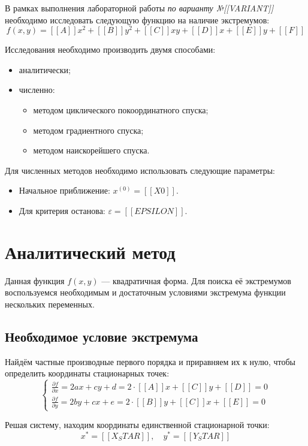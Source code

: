 \documentclass[12pt]{article}
\begin{document}
В рамках выполнения лабораторной работы \textit{по варианту №[[VARIANT]]} необходимо исследовать следующую функцию на наличие экстремумов:
\[
  f(x, y) = [[A]]x^2 + [[B]]y^2 + [[C]]xy + [[D]]x + [[E]]y + [[F]]
\]

Исследования необходимо производить двумя способами:
\begin{itemize}
  \item аналитически;
  \item численно:
  \begin{itemize}
    \item методом циклического покоординатного спуска;
    \item методом градиентного спуска;
    \item методом наискорейшего спуска.
  \end{itemize}
\end{itemize}

Для численных методов необходимо использовать следующие параметры:
\begin{itemize}
  \item Начальное приближение: \( x^{(0)}=[[X0]] \).
  \item Для критерия останова: \( \varepsilon = [[EPSILON]] \).
\end{itemize}

\newpage

\section{Аналитический метод}

Данная функция \( f(x,y) \) --- квадратичная форма. Для поиска её экстремумов воспользуемся необходимым и достаточным условиями экстремума функции нескольких переменных.

\subsection{Необходимое условие экстремума}

Найдём частные производные первого порядка и приравняем их к нулю, чтобы определить координаты стационарных точек:
\[
  \begin{cases}
    \frac{\partial f}{\partial x} = 2ax+cy+d= 2 \cdot [[A]]x + [[C]]y + [[D]] = 0 \\
    \frac{\partial f}{\partial y} = 2by+cx+e= 2 \cdot [[B]]y + [[C]]x + [[E]] = 0
  \end{cases}
\]

Решая систему, находим координаты единственной стационарной точки:
\[
x^* = [[X_STAR]], \quad y^* = [[Y_STAR]]
\]
\end{document}
